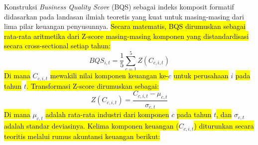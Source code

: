 \documentclass[12pt,a4paper]{article}
\begin{document}
Konstruksi \emph{Business Quality Score} (BQS) sebagai indeks komposit
formatif didasarkan pada landasan ilmiah teoretis yang kuat untuk
masing-masing dari lima pilar keuangan penyusunnya.
\hl{Secara matematis, BQS dirumuskan sebagai rata-rata aritmetika dari Z-score masing-masing komponen yang distandardisasi secara cross-sectional setiap tahun:
}$$BQS_{i,t} = \frac{1}{5} \sum_{c=1}^5 Z(C_{c,i,t})$$\hl{
Di mana }$C_{c,i,t}$\hl{ mewakili nilai komponen keuangan ke-}$c$\hl{ untuk perusahaan }$i$\hl{ pada tahun }$t$\hl{. Transformasi Z-score dirumuskan sebagai:
}$$Z(C_{c,i,t}) = \frac{C_{c,i,t} - \mu_{c,t}}{\sigma_{c,t}}$$\hl{
Di mana }$\mu_{c,t}$\hl{ adalah rata-rata industri dari komponen }$c$\hl{ pada tahun }$t$\hl{, dan }$\sigma_{c,t}$\hl{ adalah standar deviasinya. Kelima komponen keuangan (}$C_{c,i,t}$\hl{) diturunkan secara teoritis melalui rumus akuntansi keuangan berikut:}
\end{document}
